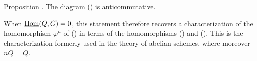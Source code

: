 \medskip
\noindent\underline{Proposition .}
\underline{The diagram () is anticommutative.}

When $\uHom(Q,G)=0$, this statement therefore recovers a
characterization of the homomorphism $\varphi^n$ of () in terms
of the homomorphisms () and ().  This is the
characterization formerly used in the theory of abelian schemes,
where moreover $nQ=Q$.
